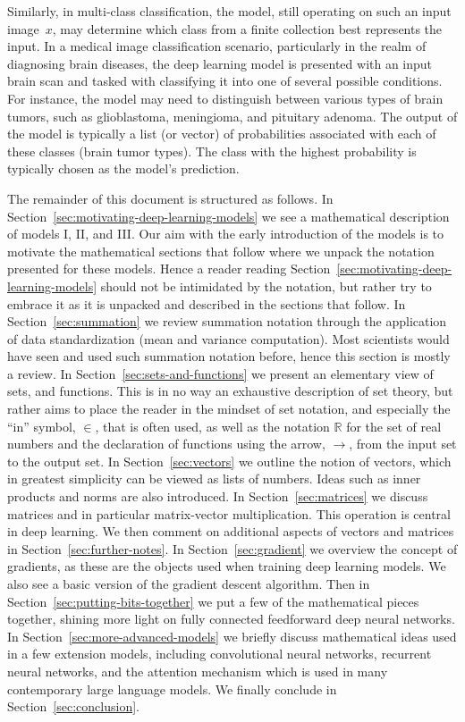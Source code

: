 Similarly, in multi-class classification, the model, still operating on such an input image~$x$, may determine which class from a finite collection best represents the input. In a medical image classification scenario, particularly in the realm of diagnosing brain diseases, the deep learning model is presented with an input brain scan and tasked with classifying it into one of several possible conditions. For instance, the model may need to distinguish between various types of brain tumors, such as glioblastoma, meningioma, and pituitary adenoma. The output of the model is typically a list (or vector) of probabilities associated with each of these classes (brain tumor types). The class with the highest probability is typically chosen as the model's prediction.

The remainder of this document is structured as follows. In Section~\ref{sec:motivating-deep-learning-models} we see a mathematical description of models I, II, and III. Our aim with the early introduction of the models is to motivate the mathematical sections that follow where we unpack the notation presented for these models. Hence a reader reading Section~\ref{sec:motivating-deep-learning-models} should not be intimidated by the notation, but rather try to embrace it as it is unpacked and described in the sections that follow. In Section~\ref{sec:summation} we review summation notation through the application of data standardization (mean and variance computation). Most scientists would have seen and used such summation notation before, hence this section is mostly a review.  In Section~\ref{sec:sets-and-functions} we present an elementary view of sets, and functions. This is in no way an exhaustive description of set theory, but rather aims to place the reader in the mindset of set notation, and especially the ``in'' symbol, $\in$, that is often used, as well as the notation ${\mathbb R}$ for the set of real numbers and the declaration of functions using the arrow, $\to$, from the input set to the output set. In Section~\ref{sec:vectors} we outline the notion of vectors, which in greatest simplicity can be viewed as lists of numbers. Ideas such as inner products and norms are also introduced. In Section~\ref{sec:matrices} we discuss matrices and in particular matrix-vector multiplication. This operation is central in deep learning. We then comment on additional aspects of vectors and matrices in Section~\ref{sec:further-notes}. In Section~\ref{sec:gradient} we overview the concept of gradients, as these are the objects used when training deep learning models. We also see a basic version of the gradient descent algorithm. Then in Section~\ref{sec:putting-bits-together} we put a few of the mathematical pieces together, shining more light on fully connected feedforward deep neural networks. In Section~\ref{sec:more-advanced-models} we briefly discuss mathematical ideas used in a few extension models, including convolutional neural networks, recurrent neural networks, and the attention mechanism which is used in many contemporary large language models. We finally conclude in Section~\ref{sec:conclusion}.
